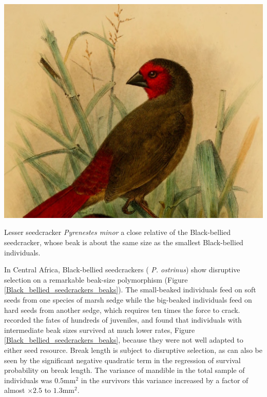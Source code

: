 \begin{marginfigure}
\begin{center}
\includegraphics[width= \textwidth]{illustration_images/Quant_gen/Pyrenestes_seedcracker/Pyrenestes_minor.jpg}
\end{center}
\caption{Lesser seedcracker {\it Pyrenestes minor} a close relative of
  the Black-bellied seedcracker, whose beak is about the same size as
  the smallest Black-bellied individuals.  }  
\end{marginfigure}
In Central Africa, Black-bellied seedcrackers ({\it
  P. ostrinus}) show disruptive selection on a remarkable beak-size polymorphism (Figure \ref{Black_bellied_seedcrackers_beaks}).  The small-beaked individuals feed on
soft  seeds from one species of marsh sedge while the big-beaked
individuals feed on hard seeds from another sedge, which
requires ten times the force to crack.  \citet{smith1993disruptive}
recorded the fates of hundreds of juveniles, and found that
individuals with intermediate beak sizes survived at much lower rates,
Figure \ref{Black_bellied_seedcrackers_beaks}, because they were not
well adapted to either seed resource.  Break length is subject to
disruptive selection, as can also be seen by the significant negative quadratic
term in the regression of survival probability on break length. The variance of mandible in the total sample of individuals was
$0.5$mm$^2$ in the survivors this variance increased by a factor of
almost $\times 2.5$ to $1.3$mm$^2$.  

